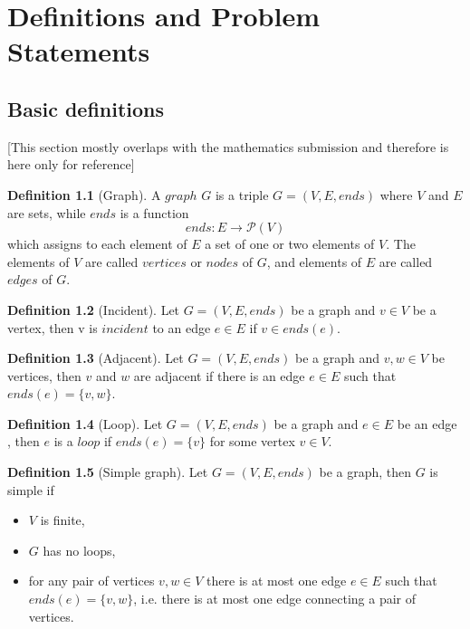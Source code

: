 \documentclass{report}
\theoremstyle{plain}
\theoremstyle{definition}
\newtheorem{definition}{Definition}
\theoremstyle{remark}
\begin{document}
\chapter{Definitions and Problem Statements}

\section*{Basic definitions}

[This section mostly overlaps with the mathematics submission and therefore is here only for reference]

\begin{definition}[Graph]
A $graph$  $G$ is a triple $G = (V, E, ends)$ where $V$ and $E$ are sets, while $ends$ is a function 
  \begin{equation}
  ends:E\to \mathcal P \left({V}\right)
  \end{equation}
which assigns to each element of $E$ a set of one or two elements of $V$. The elements of $V$ are called $vertices$ or $nodes$ of $G$, and elements of $E$ are called $edges$ of $G$.
\end{definition}

\begin{definition}[Incident]
Let $G = (V, E, ends)$ be a graph and $v\in V$ be a vertex, then v is $incident$ to an edge $e \in E$ if $v \in ends(e)$.
\end{definition}

\begin{definition}[Adjacent]
Let $G = (V, E, ends)$ be a graph and $v,w\in V$ be vertices, then $v$ and $w$ are adjacent if there is an edge $ e \in E$ such that $ends(e) = \{v, w\}$.
\end{definition}

\begin{definition}[Loop]
Let $G = (V, E, ends)$ be a graph and $e \in E$ be an edge , then $e$ is a $loop$ if $ends(e) = \{v\}$ for some vertex $v \in V$.
\end{definition}

\begin{definition}[Simple graph]
Let $G = (V, E, ends)$ be a graph, then $G$ is simple if
\begin{itemize}
\item $V$ is finite,
\item $G$ has no loops,
\item for any pair of vertices $v,w \in V$ there is at most one edge $e \in E$ such that $ends(e) = \{v, w\}$, i.e. there is at most one edge connecting a pair of vertices.
\end{itemize}
\end{definition}
\end{document}
